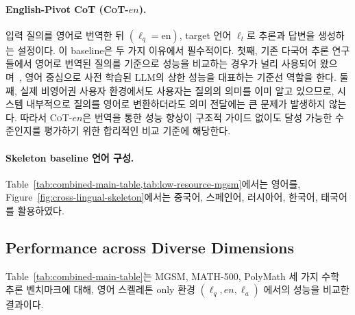 \paragraph{English-Pivot CoT (\textsc{CoT-$en$}).}
입력 질의를 영어로 번역한 뒤 $(\ell_q=\text{en})$, target 언어 $\ell_t$로 추론과 답변을 생성하는 설정이다. 이 baseline은 두 가지 이유에서 필수적이다. 첫째, 기존 다국어 추론 연구들에서 영어로 번역된 질의를 기준으로 성능을 비교하는 경우가 널리 사용되어 왔으며~\citep{clp-emnlp2023,xlt-emnlp2023,trans-allneed-2025naacl}, 영어 중심으로 사전 학습된 LLM의 상한 성능을 대표하는 기준선 역할을 한다. 둘째, 실제 비영어권 사용자 환경에서도 사용자는 질의의 의미를 이미 알고 있으므로, 시스템 내부적으로 질의를 영어로 변환하더라도 의미 전달에는 큰 문제가 발생하지 않는다. 따라서 \textsc{CoT-$en$}은 번역을 통한 성능 향상이 구조적 가이드 없이도 달성 가능한 수준인지를 평가하기 위한 합리적인 비교 기준에 해당한다.

\paragraph{Skeleton baseline 언어 구성.} 
Table~\ref{tab:combined-main-table,tab:low-resource-mgsm}에서는 영어를, Figure~\ref{fig:cross-lingual-skeleton}에서는 중국어, 스페인어, 러시아어, 한국어, 태국어를 활용하였다.

\subsection{Performance across Diverse Dimensions}

Table~\ref{tab:combined-main-table}는 MGSM, MATH-500, PolyMath 세 가지 수학 추론 벤치마크에 대해,  영어 스켈레톤 only 환경 $(\ell_q, en, \ell_a)$ 에서의 성능을 비교한 결과이다.

